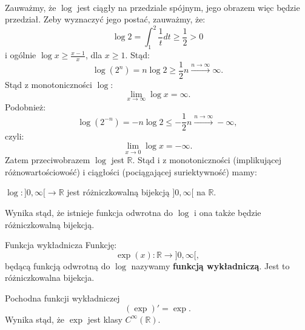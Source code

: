 \documentclass{article}
\numberwithin{defi}{section}
\numberwithin{defi}{section}
\newcommand{\R}{\mathbb{R}}
\newcommand{\oo}{\infty}
\providecommand{\half}{\frac{1}{2}}
\renewcommand{\geq}{\geqslant}
\renewcommand{\leq}{\leqslant}
\newcommand{\tb}[1]{\textbf{#1}}
\begin{document}
\paragraph{} Zauważmy, że $\log$ jest ciągły na przedziale spójnym, jego obrazem więc będzie przedział. Zeby wyznaczyć jego postać, zauważmy, że: \begin{equation}
    \log 2 = \int_{1}^{2} \frac{1}{t} dt \geq \frac{1}{2} > 0
\end{equation} i ogólnie $\log x \geq \frac{x - 1}{x}$, dla $x \geq 1$. Stąd: \begin{equation}
    \log (2 ^ n) = n \log 2 \geq \half n \xrightarrow[]{n \to \oo} \oo.
\end{equation} Stąd z monotoniczności $\log$: \begin{equation}
    \lim_{x \to \oo} \log x = \oo.
\end{equation} Podobnież: \begin{equation}
    \log (2 ^ {-n}) = -n \log 2 \leq -\half n \xrightarrow[]{n \to \oo} -\oo,
\end{equation} czyli: \begin{equation}
    \lim_{x \to 0} \log x = -\oo.
\end{equation}
Zatem przeciwobrazem $\log$ jest $\R$. Stąd i z monotoniczności (implikującej różnowartościowość) i ciągłości (pociągającej suriektywność) mamy:

\begin{obs}{}
    $\log: ]0, \oo[ \to \R$ jest różniczkowalną bijekcją $]0, \oo[$ na $\R$.
\end{obs}


Wynika stąd, że istnieje funkcja odwrotna do $\log$ i ona także będzie różniczkowalną bijekcją.

\begin{defr}{Funkcja wykładnicza}
    Funkcję: \begin{equation}
        \exp(x): \R \to ]0, \oo[,
    \end{equation} będącą funkcją odwrotną do $\log$ nazywamy \tb{funkcją wykładniczą}. Jest to różniczkowalna bijekcja.
\end{defr}

\begin{twier}{Pochodna funkcji wykładniczej}
    \begin{equation}
        (\exp)' = \exp.
    \end{equation}
    Wynika stąd, że $\exp$ jest klasy $C^\oo (\R)$.
\end{twier}
\end{document}
